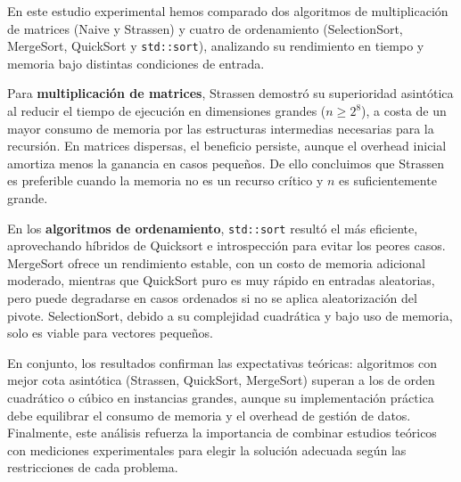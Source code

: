 En este estudio experimental hemos comparado dos algoritmos de multiplicación de matrices (Naive y Strassen) y cuatro de ordenamiento (SelectionSort, MergeSort, QuickSort y \texttt{std::sort}), analizando su rendimiento en tiempo y memoria bajo distintas condiciones de entrada.

Para \textbf{multiplicación de matrices}, Strassen demostró su superioridad asintótica al reducir el tiempo de ejecución en dimensiones grandes (\(n\ge 2^8\)), a costa de un mayor consumo de memoria por las estructuras intermedias necesarias para la recursión. En matrices dispersas, el beneficio persiste, aunque el overhead inicial amortiza menos la ganancia en casos pequeños. De ello concluimos que Strassen es preferible cuando la memoria no es un recurso crítico y \(n\) es suficientemente grande.

En los \textbf{algoritmos de ordenamiento}, \texttt{std::sort} resultó el más eficiente, aprovechando híbridos de Quicksort e introspección para evitar los peores casos. MergeSort ofrece un rendimiento estable, con un costo de memoria adicional moderado, mientras que QuickSort puro es muy rápido en entradas aleatorias, pero puede degradarse en casos ordenados si no se aplica aleatorización del pivote. SelectionSort, debido a su complejidad cuadrática y bajo uso de memoria, solo es viable para vectores pequeños.

En conjunto, los resultados confirman las expectativas teóricas: algoritmos con mejor cota asintótica (Strassen, QuickSort, MergeSort) superan a los de orden cuadrático o cúbico en instancias grandes, aunque su implementación práctica debe equilibrar el consumo de memoria y el overhead de gestión de datos. Finalmente, este análisis refuerza la importancia de combinar estudios teóricos con mediciones experimentales para elegir la solución adecuada según las restricciones de cada problema.  
